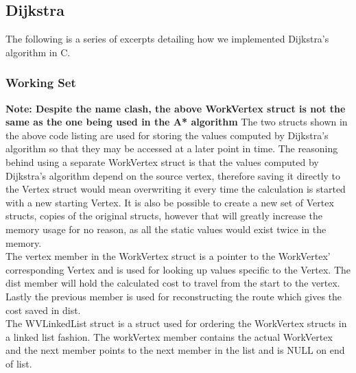 \subsection{Dijkstra}

The following is a series of excerpts detailing how we implemented Dijkstra's algorithm in C.

\subsubsection{Working Set}



\textbf{Note: Despite the name clash, the above WorkVertex struct is not the same as the one being used in the A* algorithm}
The two structs shown in the above code listing are used for storing the values computed by Dijkstra's algorithm so that they may be accessed at a later point in time. The reasoning behind using a separate WorkVertex struct is that the values computed by Dijkstra's algorithm depend on the source vertex, therefore saving it directly to the Vertex struct would mean overwriting it every time the calculation is started with a new starting Vertex. It is also be possible to create a new set of Vertex structs, copies of the original structs, however that will greatly increase the memory usage for no reason, as all the static values would exist twice in the memory.\\
The vertex member in the WorkVertex struct is a pointer to the WorkVertex' corresponding Vertex and is used for looking up values specific to the Vertex. The dist member will hold the calculated cost to travel from the start to the vertex. Lastly the previous member is used for reconstructing the route which gives the cost saved in dist.\\
The WVLinkedList struct is a struct used for ordering the WorkVertex structs in a linked list fashion. The workVertex member contains the actual WorkVertex and the next member points to the next member in the list and is NULL on end of list.